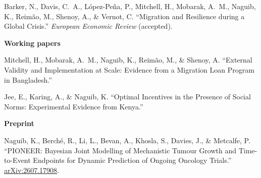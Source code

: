 \documentclass[11pt]{article}
\begin{document}
Barker, N., Davis, C.~A., L\'{o}pez-Pe\~{n}a, P., Mitchell, H., Mobarak, A.~M., Naguib, K., Reim\~{a}o, M., Shenoy, A., \& Vernot, C. ``Migration and Resilience during a Global Crisis.'' \textit{European Economic Review} (accepted).

\medskip

\textbf{Working papers}

Mitchell, H., Mobarak, A.~M., Naguib, K., Reim\~{a}o, M., \& Shenoy, A. ``External Validity and Implementation at Scale: Evidence from a Migration Loan Program in Bangladesh.''

\smallskip

Jee, E., Karing, A., \& Naguib, K. ``Optimal Incentives in the Presence of Social Norms: Experimental Evidence from Kenya.''

\medskip

\textbf{Preprint}

Naguib, K., Berch\'{e}, R., Li, L., Bevan, A., Khosla, S., Davies, J., \& Metcalfe, P. ``PIONEER: Bayesian Joint Modelling of Mechanistic Tumour Growth and Time-to-Event Endpoints for Dynamic Prediction of Ongoing Oncology Trials.'' \href{https://arxiv.org/abs/2607.17908}{arXiv:2607.17908}.
\end{document}
